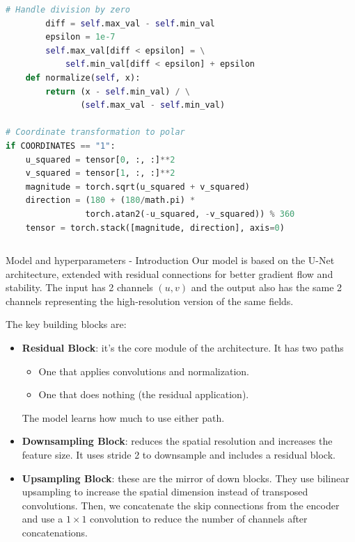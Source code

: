 \documentclass[footline=authortitle]{beamer}
\begin{document}
\begin{frame}[fragile]
\begin{columns}
\begin{column}{0.6\textwidth}
\begin{lstlisting}[language=Python, basicstyle=\ttfamily\tiny]
        # Handle division by zero
        diff = self.max_val - self.min_val
        epsilon = 1e-7
        self.max_val[diff < epsilon] = \
            self.min_val[diff < epsilon] + epsilon
    def normalize(self, x):
        return (x - self.min_val) / \
               (self.max_val - self.min_val)

# Coordinate transformation to polar
if COORDINATES == "1":
    u_squared = tensor[0, :, :]**2
    v_squared = tensor[1, :, :]**2
    magnitude = torch.sqrt(u_squared + v_squared)
    direction = (180 + (180/math.pi) * 
                torch.atan2(-u_squared, -v_squared)) % 360
    tensor = torch.stack([magnitude, direction], axis=0)
\end{lstlisting}
\end{column}
\end{columns}

\end{frame}



\begin{frame}{Model and hyperparameters - Introduction}
\footnotesize
    Our model is based on the U-Net architecture, extended with residual connections for better gradient flow and stability.
    The input has 2 channels $(u,v)$ and the output also has the same 2 channels representing the high-resolution version of the same fields.

    The key building blocks are:
    \begin{itemize}
        \item \textbf{Residual Block}: it's the core module of the architecture. It has two paths
        \begin{itemize}
            \item One that applies convolutions and normalization.
            \item One that does nothing (the residual application).
        \end{itemize}
        The model learns how much to use either path.
        \item \textbf{Downsampling Block}: reduces the spatial resolution and increases the feature size. It uses stride 2 to downsample and includes a residual block.
        \item \textbf{Upsampling Block}: these are the mirror of down blocks. They use bilinear upsampling to increase the spatial dimension instead of transposed convolutions. Then, we concatenate  the skip connections from the encoder and use a $1\times 1$ convolution to reduce the number of channels after concatenations.
    \end{itemize}
    \end{frame}
\end{document}
